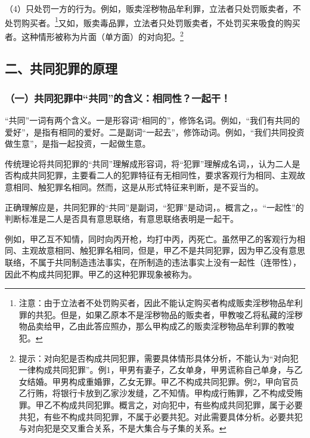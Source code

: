 （4）只处罚一方的行为。例如，贩卖淫秽物品牟利罪，立法者只处罚贩卖者，不处罚购买者。\footnote{注意：由于立法者不处罚购买者，因此不能认定购买者构成贩卖淫秽物品牟利罪的共犯。但是，如果乙原本不是淫秽物品的贩卖者，甲教唆乙将私藏的淫秽物品卖给甲，乙由此答应照办，那么甲构成乙的贩卖淫秽物品牟利罪的教唆犯。}又如，贩卖毒品罪，立法者只处罚贩卖者，不处罚买来吸食的购买者。这种情形被称为片面（单方面）的对向犯。\footnote{提示：对向犯是否构成共同犯罪，需要具体情形具体分析，不能认为“对向犯一律构成共同犯罪”。例1，甲男有妻子，乙女单身，甲男谎称自己单身，与乙女结婚。甲男构成重婚罪，乙女无罪。甲乙不构成共同犯罪。例2，甲向官员乙行贿，将银行卡放到乙家沙发缝，乙不知情。甲构成行贿罪，乙不构成受贿罪。甲乙不构成共同犯罪。概言之，对向犯中，有些构成共同犯罪，属于必要共犯，有些不构成共同犯罪，不属于必要共犯。对此需要具体分析。必要共犯与对向犯是交叉重合关系，不是大集合与子集的关系。}

\subsection*{二、共同犯罪的原理}

\subsubsection*{（一）共同犯罪中“共同”的含义：相同性？一起干！}

“共同”一词有两个含义。一是形容词“相同的”，修饰名词。例如，“我们有共同的爱好”，是指有相同的爱好。二是副词“一起去”，修饰动词。例如，“我们共同投资做生意”，是指一起投资，一起做生意。

传统理论将共同犯罪的“共同”理解成形容词，将“犯罪”理解成名词，，认为二人是否构成共同犯罪，主要看二人的犯罪特征有无相同性，要求客观行为相同、主观故意相同、触犯罪名相同。然而，这是从形式特征来判断，是不妥当的。

正确理解应是，共同犯罪的“共同”是副词，“犯罪”是动词，。概言之，。“一起性”的判断标准是二人是否具有意思联络，有意思联络表明是一起干。

例如，甲乙互不知情，同时向丙开枪，均打中丙，丙死亡。虽然甲乙的客观行为相同、主观故意相同、触犯罪名相同，但是，甲乙不是共同犯罪，因为甲乙没有意思联络，不属于共同制造违法事实，在所制造的违法事实上没有一起性（连带性），因此不构成共同犯罪。甲乙的这种犯罪现象被称为。

